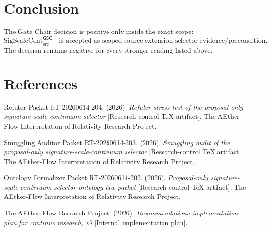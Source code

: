 \documentclass[11pt]{article}
\newcommand{\SigScaleCont}{\mathrm{SigScaleCont}_{\mathrm{src}}^{\mathsf{GSC}}}
\begin{document}
\section{Conclusion}

The Gate Chair decision is positive only inside the exact scope:
\[
\SigScaleCont
\quad\text{is accepted as scoped source-extension selector evidence/precondition.}
\]
The decision remains negative for every stronger reading listed above.

\section{References}

Refuter Packet RT-20260614-204. (2026). \emph{Refuter stress test of the
proposal-only signature-scale-continuum selector} [Research-control TeX
artifact]. The AEther-Flow Interpretation of Relativity Research Project.

Smuggling Auditor Packet RT-20260614-203. (2026). \emph{Smuggling audit of the
proposal-only signature-scale-continuum selector} [Research-control TeX
artifact]. The AEther-Flow Interpretation of Relativity Research Project.

Ontology Formalizer Packet RT-20260614-202. (2026). \emph{Proposal-only
signature-scale-continuum selector ontology-law packet} [Research-control TeX
artifact]. The AEther-Flow Interpretation of Relativity Research Project.

The AEther-Flow Research Project. (2026). \emph{Recommendations implementation
plan for continue research, v9} [Internal implementation plan].
\end{document}
